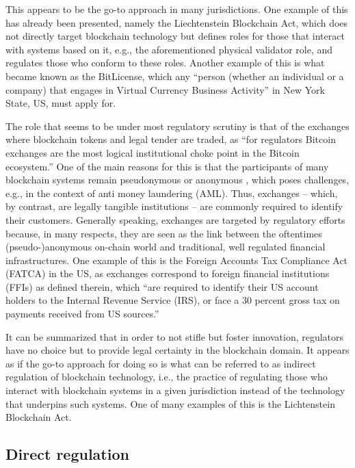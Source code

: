 This appears to be the go-to approach in many jurisdictions.
One example of this has already been presented, namely the Liechtenstein Blockchain Act, which does not directly target blockchain technology but defines roles for those that interact with systems based on it, e.g., the aforementioned physical validator role, and regulates those who conform to these roles.
Another example of this is what became known as the BitLicense, which any ``person (whether an individual or a company) that engages in Virtual Currency Business Activity'' in New York State, US, must apply for. \autocite{ny2021bitlicense}

The role that seems to be under most regulatory scrutiny is that of the exchanges where blockchain tokens and legal tender are traded, as ``for regulators Bitcoin exchanges are the most logical institutional choke point in the Bitcoin ecosystem.'' \autocite[1153]{tsukerman2015}
One of the main reasons for this is that the participants of many blockchain systems remain pseudonymous \autocite[6]{zhang2019} or anonymous \autocite{github2013cryptonote}, which poses challenges, e.g., in the context of anti money laundering (AML).
Thus, exchanges -- which, by contrast, are legally tangible institutions -- are commonly required to identify their customers.
Generally speaking, exchanges are targeted by regulatory efforts because, in many respects, they are seen as the link between the oftentimes (pseudo-)anonymous on-chain world and traditional, well regulated financial infrastructures.
One example of this is the Foreign Accounts Tax Compliance Act (FATCA) in the US, as exchanges correspond to foreign financial institutions (FFIs) as defined therein, which ``are required to identify their US account holders to the Internal Revenue Service (IRS), or face a 30 percent gross tax on payments received from US sources.'' \autocite[1151]{tsukerman2015} 

It can be summarized that in order to not stifle but foster innovation, regulators have no choice but to provide legal certainty in the blockchain domain.
It appears as if the go-to approach for doing so is what can be referred to as indirect regulation of blockchain technology, i.e., the practice of regulating those who interact with blockchain  systems in a given jurisdiction instead of the technology that underpins such systems.
One of many examples of this is the Lichtenstein Blockchain Act.

\subsection{Direct regulation}

